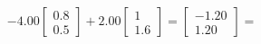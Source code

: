 \documentclass[preview]{standalone}
\begin{document}
\begin{align*}
-4.00 \begin{bmatrix} 0.8 \\ 0.5 \end{bmatrix} + 2.00 \begin{bmatrix} 1 \\ 1.6 \end{bmatrix} = \begin{bmatrix} -1.20 \\ 1.20 \end{bmatrix} =
\end{align*}
\end{document}
